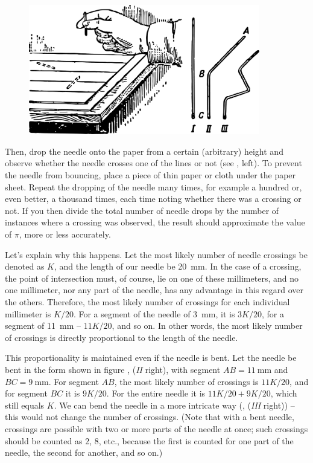 \begin{figure}[h!]
\centering
\includegraphics[width=0.9\textwidth]{figures/ch-09/fig-124.pdf}
\end{figure}

Then, drop the needle onto the paper from a certain (arbitrary) height and observe whether the needle crosses one of the lines or not (see , left). To prevent the needle from bouncing, place a piece of thin paper or cloth under the paper sheet. Repeat the dropping of the needle many times, for example a hundred or, even better, a thousand times, each time noting whether there was a crossing or not. If you then divide the total number of needle drops by the number of instances where a crossing was observed, the result should approximate the value of $\pi$, more or less accurately.

Let's explain why this happens. Let the most likely number of needle crossings be denoted as  $K$, and the length of our needle be \SI{20}{\milli\meter}. In the case of a crossing, the point of intersection must, of course, lie on one of these millimeters, and no one millimeter, nor any part of the needle, has any advantage in this regard over the others. Therefore, the most likely number of crossings for each individual millimeter is $K/20$. For a segment of the needle of \SI{3}{\milli\meter}, it is $ 3K/20$, for a segment of \SI{11}{\milli\meter} -- $ 11K/20$, and so on. In other words, the most likely number of crossings is directly proportional to the length of the needle.

This proportionality is maintained even if the needle is bent. Let the needle be bent in the form shown in figure , (\emph{II} right), with segment $AB = \SI{11}{\milli\meter}$ and $BC = \SI{9}{\milli\meter}$. For segment $AB$, the most likely number of crossings is $11K/20$, and for segment $BC$ it is $9K/20$. For the entire needle it is $ 11K/20 + 9K/20$, which still equals $K$. We can bend the needle in a more intricate way (, (\emph{III} right)) -- this would not change the number of crossings. (Note that with a bent needle, crossings are possible with two or more parts of the needle at once; such crossings should be counted as 2, 8, etc., because the first is counted for one part of the needle, the second for another, and so on.)

